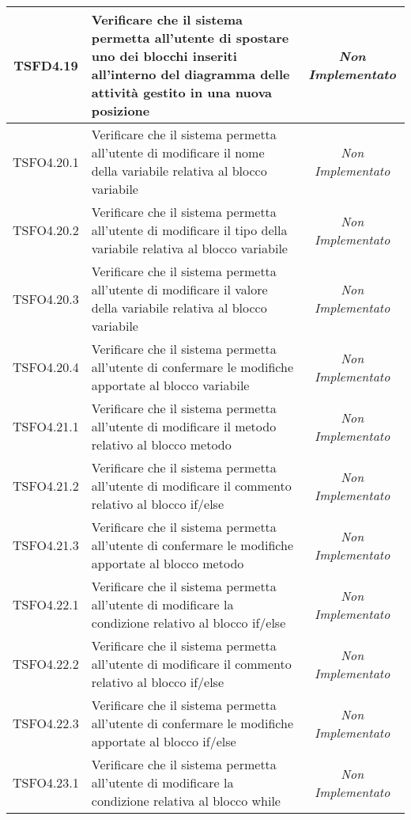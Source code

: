 \begin{longtable}{|c|>{}m{8cm}|c|}
\hypertarget{TSFD4.19}{TSFD4.19} & Verificare che il sistema permetta all'utente di spostare uno dei blocchi inseriti all’interno del diagramma delle attività gestito in una nuova posizione & \textit{Non Implementato}\\ \hline
\hypertarget{TSFO4.20.1}{TSFO4.20.1} & Verificare che il sistema permetta all'utente di modificare il nome della variabile relativa al blocco variabile & \textit{Non Implementato}\\ \hline
\hypertarget{TSFO4.20.2}{TSFO4.20.2} & Verificare che il sistema permetta all'utente di modificare il tipo della variabile relativa al blocco variabile & \textit{Non Implementato}\\ \hline
\hypertarget{TSFO4.20.3}{TSFO4.20.3} & Verificare che il sistema permetta all'utente di modificare il valore della variabile relativa al blocco variabile & \textit{Non Implementato}\\ \hline
\hypertarget{TSFO4.20.4}{TSFO4.20.4} & Verificare che il sistema permetta all'utente di confermare le modifiche apportate al blocco variabile & \textit{Non Implementato}\\ \hline
\hypertarget{TSFO4.21.1}{TSFO4.21.1} & Verificare che il sistema permetta all'utente di modificare il metodo relativo al blocco metodo & \textit{Non Implementato}\\ \hline
\hypertarget{TSFO4.21.2}{TSFO4.21.2} & Verificare che il sistema permetta all'utente di modificare il commento relativo al blocco if/else & \textit{Non Implementato}\\ \hline
\hypertarget{TSFO4.21.3}{TSFO4.21.3} & Verificare che il sistema permetta all'utente di confermare le modifiche apportate al blocco metodo & \textit{Non Implementato}\\ \hline
\hypertarget{TSFO4.22.1}{TSFO4.22.1} & Verificare che il sistema permetta all'utente di modificare la condizione relativo al blocco if/else & \textit{Non Implementato}\\ \hline
\hypertarget{TSFO4.22.2}{TSFO4.22.2} & Verificare che il sistema permetta all'utente di modificare il commento relativo al blocco if/else & \textit{Non Implementato}\\ \hline
\hypertarget{TSFO4.22.3}{TSFO4.22.3} & Verificare che il sistema permetta all'utente di confermare le modifiche apportate al blocco if/else & \textit{Non Implementato}\\ \hline
\hypertarget{TSFO4.23.1}{TSFO4.23.1} & Verificare che il sistema permetta all'utente di modificare la condizione relativa al blocco while & \textit{Non Implementato}\\ \hline

\end{longtable}
